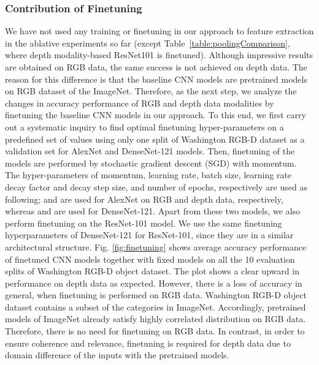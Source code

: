 \subsubsection{Contribution of Finetuning} \label{sec.exp.ma.finetuning}
We have not used any training or finetuning in our approach to feature extraction in the ablative experiments so far (except Table~\ref{table:poolingComparison}, where depth modality-based ResNet101 is finetuned). Although impressive results are obtained on RGB data, the same success is not achieved on depth data. The reason for this difference is that the baseline CNN models are pretrained models on RGB dataset of the ImageNet. Therefore, as the next step, we analyze the changes in accuracy performance of RGB and depth data modalities by finetuning the baseline CNN models in our approach. To this end, we first carry out a systematic inquiry to find optimal finetuning hyper-parameters on a predefined set of values using only one split of Washington RGB-D dataset as a validation set for AlexNet and DenseNet-121 models. Then, finetuning of the models are performed by stochastic gradient descent (SGD) with momentum. The hyper-parameters of momentum, learning rate, batch size, learning rate decay factor and decay step size, and number of epochs, respectively are used as following;  and  are used for AlexNet on RGB and depth data, respectively, whereas  and  are used for DenseNet-121. Apart from these two models, we also perform finetuning on the ResNet-101 model. We use the same finetuning hyperparameters of DenseNet-121 for ResNet-101, since they are in a similar architectural structure. Fig. \ref{fig:finetuning} shows average accuracy performance of finetuned CNN models together with fixed models on all the 10 evaluation splits of Washington RGB-D object dataset. The plot shows a clear upward in performance on depth data as expected. However, there is a loss of accuracy in general, when finetuning is performed on RGB data. Washington RGB-D object dataset contains a subset of the categories in ImageNet. Accordingly, pretrained models of ImageNet already satisfy highly correlated distribution on RGB data. Therefore, there is no need for finetuning on RGB data. In contrast, in order to ensure coherence and relevance, finetuning is required for depth data due to domain difference of the inputs with the pretrained models.

